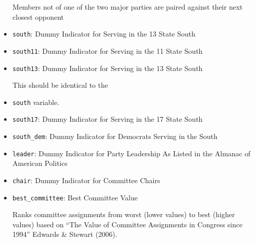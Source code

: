 \documentclass[12pt]{article}
\begin{document}
\begin{itemize}
	Members not of one of the two major parties are paired against their next closest opponent
	
	\item \verb|south|: Dummy Indicator for Serving in the 13 State South
	
	\item \verb|south11|: Dummy Indicator for Serving in the 11 State South
	
	\item \verb|south13|: Dummy Indicator for Serving in the 13 State South
	
	This should be identical to the \item \verb|south| variable.
	
	\item \verb|south17|: Dummy Indicator for Serving in the 17 State South
	
	\item \verb|south_dem|: Dummy Indicator for Democrats Serving in the South
	
	\item \verb|leader|: Dummy Indicator for Party Leadership As Listed in the Almanac of American Politics
	
	\item \verb|chair|: Dummy Indicator for Committee Chairs
	
	\item \verb|best_committee|: Best Committee Value
	
	Ranks committee assignments from worst (lower values) to best (higher values) based on ``The Value of Committee Assignments in Congress since 1994'' Edwards \& Stewart (2006).
\end{itemize}
\end{document}
